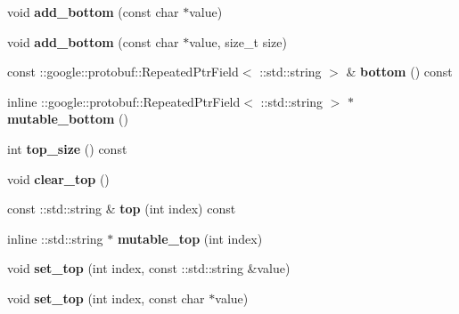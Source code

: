 \begin{DoxyCompactItemize}
void {\bfseries add\+\_\+bottom} (const char $\ast$value)
\item 
\mbox{\label{classcaffe_1_1_v1_layer_parameter_a96990fa0dbefa224b296da8c1aed74e3}} 
void {\bfseries add\+\_\+bottom} (const char $\ast$value, size\+\_\+t size)
\item 
\mbox{\label{classcaffe_1_1_v1_layer_parameter_a666c6bf58bb09220e8d157b351815d25}} 
const \+::google\+::protobuf\+::\+Repeated\+Ptr\+Field$<$ \+::std\+::string $>$ \& {\bfseries bottom} () const
\item 
\mbox{\label{classcaffe_1_1_v1_layer_parameter_ac638d7d18d5034b0efa28fad72e2c704}} 
inline \+::google\+::protobuf\+::\+Repeated\+Ptr\+Field$<$ \+::std\+::string $>$ $\ast$ {\bfseries mutable\+\_\+bottom} ()
\item 
\mbox{\label{classcaffe_1_1_v1_layer_parameter_a015c8e665535622de3a8f5d33c06b237}} 
int {\bfseries top\+\_\+size} () const
\item 
\mbox{\label{classcaffe_1_1_v1_layer_parameter_a5852dbfc38a6e686f708ebc482fafbfd}} 
void {\bfseries clear\+\_\+top} ()
\item 
\mbox{\label{classcaffe_1_1_v1_layer_parameter_ab8c1fee73398ac149cafa990e61dc77b}} 
const \+::std\+::string \& {\bfseries top} (int index) const
\item 
\mbox{\label{classcaffe_1_1_v1_layer_parameter_a376e81b2404e63a921f0fe8e964172e8}} 
inline \+::std\+::string $\ast$ {\bfseries mutable\+\_\+top} (int index)
\item 
\mbox{\label{classcaffe_1_1_v1_layer_parameter_adc651384464598f1a0d50a8b8e971084}} 
void {\bfseries set\+\_\+top} (int index, const \+::std\+::string \&value)
\item 
\mbox{\label{classcaffe_1_1_v1_layer_parameter_a8bfb494fadbfd4cc1f52372e107857bf}} 
void {\bfseries set\+\_\+top} (int index, const char $\ast$value)

\end{DoxyCompactItemize}
